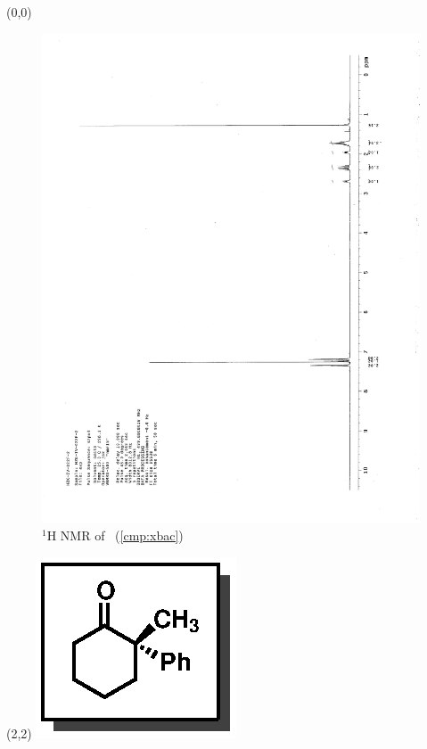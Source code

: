 \begin{textblock}{20}(0,0)
\begin{figure}[htb]
\caption{$^1$H NMR of \CMPxbac\ (\ref{cmp:xbac})}
\includegraphics[scale=0.75, trim = 0mm 0mm 0mm 5mm,
clip]{chp_singlecarbon/images/nmr/xbacH}
\vspace{-100pt}
\end{figure}
\end{textblock}
\begin{textblock}{1}(2,2)
\includegraphics[scale=0.8, angle=90]{chp_singlecarbon/images/xbac}
\end{textblock}
